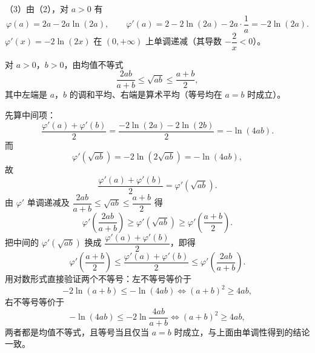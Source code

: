 \begin{answer}
（3）由（2），对 $a>0$ 有
\nopagebreak[4]
\[\varphi(a)=2a-2a\ln(2a),\qquad \varphi'(a)=2-2\ln(2a)-2a\cdot\frac{1}{a}=-2\ln(2a).\]
$\varphi'(x)=-2\ln(2x)$ 在 $(0,+\infty)$ 上单调递减（其导数 $-\dfrac2x<0$）。

对 $a>0$，$b>0$，由均值不等式
\nopagebreak[4]
\[\frac{2ab}{a+b}\leqslant\sqrt{ab}\leqslant\frac{a+b}{2},\]
其中左端是 $a$，$b$ 的调和平均、右端是算术平均（等号均在 $a=b$ 时成立）。

先算中间项：
\nopagebreak[4]
\[\frac{\varphi'(a)+\varphi'(b)}{2}=\frac{-2\ln(2a)-2\ln(2b)}{2}=-\ln(4ab).\]
而
\nopagebreak[4]
\[\varphi'\left(\sqrt{ab}\right)=-2\ln\left(2\sqrt{ab}\right)=-\ln(4ab),\]
故
\nopagebreak[4]
\[\frac{\varphi'(a)+\varphi'(b)}{2}=\varphi'\left(\sqrt{ab}\right).\]
由 $\varphi'$ 单调递减及 $\dfrac{2ab}{a+b}\leqslant\sqrt{ab}\leqslant\dfrac{a+b}{2}$ 得
\nopagebreak[4]
\[\varphi'\left(\frac{2ab}{a+b}\right)\geqslant\varphi'\left(\sqrt{ab}\right)\geqslant\varphi'\left(\frac{a+b}{2}\right).\]
把中间的 $\varphi'(\sqrt{ab})$ 换成 $\dfrac{\varphi'(a)+\varphi'(b)}{2}$，即得
\nopagebreak[4]
\[\varphi'\left(\frac{a+b}{2}\right)\leqslant\frac{\varphi'(a)+\varphi'(b)}{2}\leqslant\varphi'\left(\frac{2ab}{a+b}\right).\]
用对数形式直接验证两个不等号：左不等号等价于
\nopagebreak[4]
\[-2\ln(a+b)\leqslant-\ln(4ab)\iff(a+b)^2\geqslant 4ab,\]
右不等号等价于
\nopagebreak[4]
\[-\ln(4ab)\leqslant-2\ln\frac{4ab}{a+b}\iff(a+b)^2\geqslant 4ab,\]
两者都是均值不等式，且等号当且仅当 $a=b$ 时成立，与上面由单调性得到的结论一致。


\end{answer}